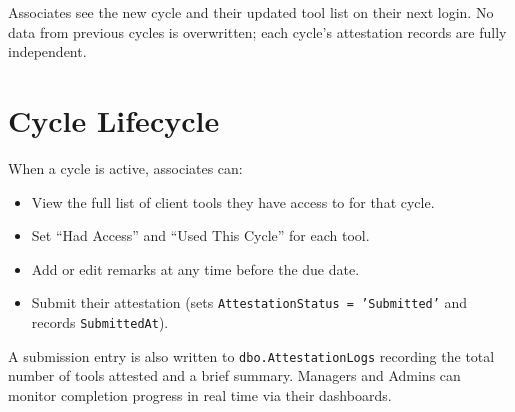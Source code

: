 \documentclass[12pt,a4paper]{report}
\begin{document}
\begin{notebox}
Associates see the new cycle and their updated tool list on their next login. No data from
previous cycles is overwritten; each cycle's attestation records are fully independent.
\end{notebox}

\section{Cycle Lifecycle}

When a cycle is active, associates can:

\begin{itemize}
  \item View the full list of client tools they have access to for that cycle.
  \item Set ``Had Access'' and ``Used This Cycle'' for each tool.
  \item Add or edit remarks at any time before the due date.
  \item Submit their attestation (sets \texttt{AttestationStatus = 'Submitted'} and records
        \texttt{SubmittedAt}).
\end{itemize}

A submission entry is also written to \texttt{dbo.AttestationLogs} recording the total number
of tools attested and a brief summary. Managers and Admins can monitor completion progress
in real time via their dashboards.

\end{document}
